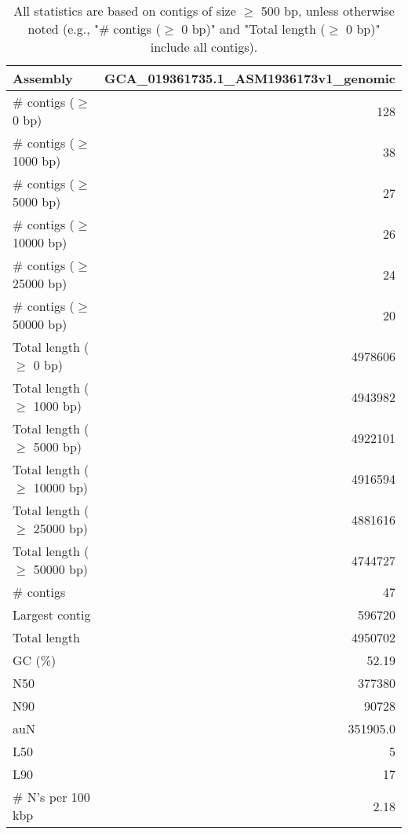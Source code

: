 \documentclass[12pt,a4paper]{article}
\begin{document}
\begin{table}[ht]
\begin{center}
\caption{All statistics are based on contigs of size $\geq$ 500 bp, unless otherwise noted (e.g., "\# contigs ($\geq$ 0 bp)" and "Total length ($\geq$ 0 bp)" include all contigs).}
\begin{tabular}{|l*{1}{|r}|}
\hline
Assembly & GCA\_019361735.1\_ASM1936173v1\_genomic \\ \hline
\# contigs ($\geq$ 0 bp) & 128 \\ \hline
\# contigs ($\geq$ 1000 bp) & 38 \\ \hline
\# contigs ($\geq$ 5000 bp) & 27 \\ \hline
\# contigs ($\geq$ 10000 bp) & 26 \\ \hline
\# contigs ($\geq$ 25000 bp) & 24 \\ \hline
\# contigs ($\geq$ 50000 bp) & 20 \\ \hline
Total length ($\geq$ 0 bp) & 4978606 \\ \hline
Total length ($\geq$ 1000 bp) & 4943982 \\ \hline
Total length ($\geq$ 5000 bp) & 4922101 \\ \hline
Total length ($\geq$ 10000 bp) & 4916594 \\ \hline
Total length ($\geq$ 25000 bp) & 4881616 \\ \hline
Total length ($\geq$ 50000 bp) & 4744727 \\ \hline
\# contigs & 47 \\ \hline
Largest contig & 596720 \\ \hline
Total length & 4950702 \\ \hline
GC (\%) & 52.19 \\ \hline
N50 & 377380 \\ \hline
N90 & 90728 \\ \hline
auN & 351905.0 \\ \hline
L50 & 5 \\ \hline
L90 & 17 \\ \hline
\# N's per 100 kbp & 2.18 \\ \hline
\end{tabular}
\end{center}
\end{table}
\end{document}

